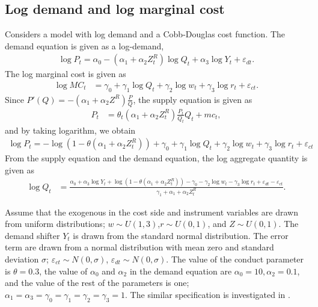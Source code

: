\documentclass[11pt, a4paper]{article}
\begin{document}
\subsection{Log demand and log marginal cost}

Considers a model with log demand and a Cobb-Douglas cost function. 
The demand equation is given as a log-demand, 
\begin{align}
    \log P_{t} = \alpha_0 - (\alpha_1 + \alpha_2 Z^R_t) \log Q_t + \alpha_3 \log Y_t + \varepsilon_{dt}.
\end{align}
The log marginal cost is given as 
\begin{align}
    \log MC_t &= \gamma_0 + \gamma_1 \log Q_t +  \gamma_2 \log w_t + \gamma_3 \log r_t + \varepsilon_{ct}.
\end{align}
Since $P'(Q) = - (\alpha_1 + \alpha_2 Z^R) \frac{P}{Q} $, the supply equation is given as
\begin{align}
    P_t &= \theta_t (\alpha_1 + \alpha_2 Z^R_t) \frac{P_t}{Q_t} Q_t + mc_t,
\end{align}
and by taking logarithm, we obtain
\begin{align}
    \log P_t = - \log(1 - \theta(\alpha_1 + \alpha_2 Z^R_t)) + \gamma_0 + \gamma_1 \log Q_t +  \gamma_2 \log w_t + \gamma_3 \log r_t + \varepsilon_{ct} \label{eq:supply_equation_loglinear}
\end{align}
From the supply equation and the demand equation, the log aggregate quantity is given as 
\begin{align}
    \log Q_t &= \frac{ \alpha_0 + \alpha_3 \log Y_t + \log (1 - \theta (\alpha_1 + \alpha_2 Z^R_t)) - \gamma_0  -  \gamma_2 \log w_t - \gamma_3 \log r_t + \varepsilon_{dt} - \varepsilon_{ct}}{\gamma_1+ \alpha_1 + \alpha_2 Z^R_t }.
\end{align}

Assume that the exogenous in the cost side and instrument variables are drawn from uniform distributions; $w \sim U(1,3)$,$r \sim U(0,1)$, and $Z \sim U(0, 1)$. 
The demand shifter $Y_t$ is drawn from the standard normal distribution.
The error term are drawn from a normal distribution with mean zero and standard deviation $\sigma$; $\varepsilon_{ct}\sim N(0,\sigma)$, $\varepsilon_{dt} \sim N(0,\sigma)$.
The value of the conduct parameter is $\theta = 0.3$, the value of $\alpha_0$ and $\alpha_2$ in the demand equation are $\alpha_0 = 10, \alpha_2 = 0.1$, and the value of the rest of the parameters is one; $\alpha_1 = \alpha_3 = \gamma_0 = \gamma_1 = \gamma_2  = \gamma_3 = 1$.
The similar specification is investigated in \cite{hyde1995can}.
\end{document}
